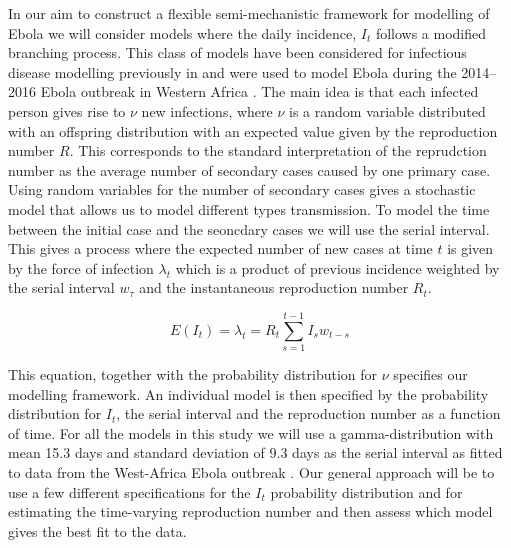 \documentclass[12pt]{article}
\begin{document}
In our aim to construct a flexible semi-mechanistic framework for modelling of Ebola we will consider models where the daily incidence, $I_t$ follows a modified branching process\cite{jacobBranchingProcessesTheir2010}. This class of models have been considered for infectious disease modelling previously in\cite{coriNewFrameworkSoftware2013,lloyd-smithSuperspreadingEffectIndividual2005,nouvelletSimpleApproachMeasure2018} and were used to model Ebola during the 2014--2016 Ebola outbreak in Western Africa \cite{whoebolaresponseteamEbolaVirusDisease2014, internationalebolaresponseteamExposurePatternsDriving2016}. The main idea is that each infected person gives rise to $\nu$ new infections, where $\nu$ is a random variable distributed with an offspring distribution with an expected value given by the reproduction number $R$. This corresponds to the standard interpretation of the reprudction number as the average number of secondary cases caused by one primary case. Using random variables for the number of secondary cases gives a stochastic model that allows us to model different types transmission. To model the time between the initial case and the seoncdary cases we will use the serial interval. This gives a process where the expected number of new cases at time $t$ is given by the force of infection $\lambda_t$ which is a product of previous incidence weighted by the serial interval $w_\tau$ and the instantaneous reproduction number $R_t$. 

\begin{equation}
  E(I_t) = \lambda_t =  R_t \sum^{t-1}_{s=1} I_s w_{t-s}
  \label{eq:mean_It}
\end{equation}

This equation, together with the probability distribution for $\nu$ specifies our modelling framework. An individual model is then specified by the probability distribution for $I_t$, the serial interval and the reproduction number as a function of time. For all the models in this study we will use a gamma-distribution with mean 15.3 days and standard deviation of 9.3 days as the serial interval as fitted to data from the West-Africa Ebola outbreak \cite{whoebolaresponseteamEbolaVirusDisease2014}. Our general approach will be to use a few different specifications for the $I_t$ probability distribution and for estimating the time-varying reproduction number and then assess which model gives the best fit to the data.
\end{document}
